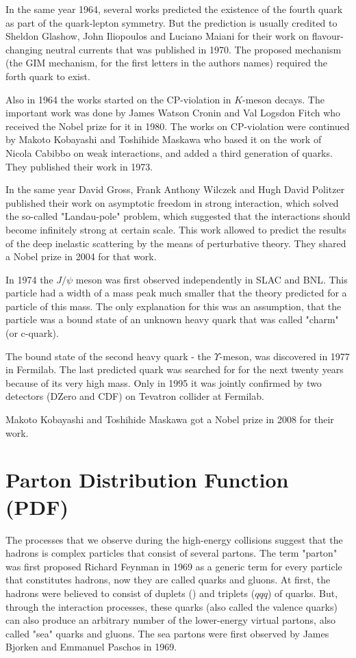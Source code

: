 In the same year 1964, several works predicted the existence of the fourth quark as part of the quark-lepton symmetry. But the prediction is usually credited to Sheldon Glashow, John Iliopoulos and Luciano Maiani for their work on flavour-changing neutral currents that was published in 1970. The proposed mechanism (the GIM mechanism, for the first letters in the authors names) required the forth quark to exist.

Also in 1964 the works started on the CP-violation in $K$-meson decays. The important work was done by James Watson Cronin and Val Logsdon Fitch who received the Nobel prize for it in 1980. The works on CP-violation were continued by Makoto Kobayashi and Toshihide Maskawa who based it on the work of Nicola Cabibbo on weak interactions, and added a third generation of quarks. They published their work in 1973.

In the same year David Gross, Frank Anthony Wilczek and Hugh David Politzer published their work on asymptotic freedom in strong interaction, which solved the so-called "Landau-pole" problem, which suggested that the interactions should become infinitely strong at certain scale. This work allowed to predict the results of the deep inelastic scattering by the means of perturbative theory. They shared a Nobel prize in 2004 for that work.

In 1974 the $J/\psi$ meson was first observed independently in SLAC and BNL. This particle had a width of a mass peak much smaller that the theory predicted for a particle of this mass. The only explanation for this was an assumption, that the particle was a bound state of an unknown heavy quark that was called "charm" (or c-quark).

The bound state of the second heavy quark - the $\Upsilon$-meson, was discovered in 1977 in Fermilab. The last predicted quark was searched for for the next twenty years because of its very high mass. Only in 1995 it was jointly confirmed by two detectors (DZero and CDF) on Tevatron collider at Fermilab.

Makoto Kobayashi and Toshihide Maskawa got a Nobel prize in 2008 for their work.

\section{Parton Distribution Function (PDF)}
The processes that we observe during the high-energy collisions suggest that the hadrons is complex particles that consist of several partons. The term "parton" was first proposed Richard Feynman in 1969 as a generic term for every particle that constitutes hadrons, now they are called quarks and gluons. At first, the hadrons were believed to consist of duplets (\qqbar) and triplets ($qqq$) of quarks. But, through the interaction processes, these quarks (also called the valence quarks) can also produce an arbitrary number of the lower-energy virtual partons, also called "sea" quarks and gluons. The sea partons were first observed by James Bjorken and Emmanuel  Paschos in 1969.


